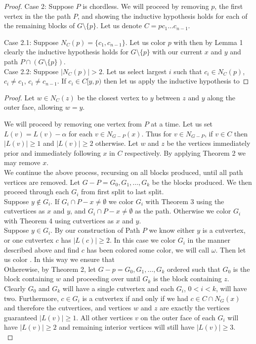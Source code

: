 \documentclass[12pt,a4paper]{article}
\begin{document}
\begin{adjustwidth}{2em}{2em}
\begin{proof}
\noindent Case 2: Suppose $P$ is chordless. We will proceed by removing $p$, the first vertex in the the path
$P$, and showing the inductive hypothesis holds for each of the remaining blocks of $G\setminus\{p\}$. Let
us denote $C=pc_1\ldots c_{n-1}$.

\noindent Case 2.1: Suppose $N_C(p)=\{c_1,c_{n-1}\}$. Let us color $p$ with  then by Lemma 1 clearly the inductive
hypothesis holds for $G\setminus\{p\}$ with our current $x$ and $y$ and path $P\cap (G\setminus\{p\})$.\\

\noindent Case 2.2: Suppose $|N_C(p)|>2$. Let us select largest $i$ such that $c_i\in N_C(p)$, $c_i\ne c_1$,
$c_i\ne c_{n-1}$. If $c_i\in C[y,p)$ then let us apply the inductive hypothesis to 

\end{proof}

\begin{proof}
Let $w\in N_C(z)$ be the closest vertex to $y$ between $z$ and $y$ along the outer face, allowing $w=y$.

We will proceed by removing one vertex from $P$ at a time. Let us set $L(v)=L(v)-\alpha$ for
each $v\in N_{G-P}(x)$. Thus for $v\in N_{G-P}$, if $v\in C$ then $|L(v)|\ge1$ and $|L(v)|\ge2$ otherwise.
Let $w$ and $z$ be the vertices immediately prior and immediately following $x$ in $C$ respectively.
By applying Theorem 2 we may remove $x$.\\

\noindent We continue the above process, recursing on all blocks produced, until all path vertices are removed.
Let $G-P=G_0,G_1,\ldots,G_k$ be the blocks produced. We then proceed through each $G_i$ from first split to last
split.\\

\noindent Suppose $y\not\in G_i$. If $G_i\cap P-x\ne\emptyset$ we color $G_i$ with Theorem 3 using the cutvertices
as $x$ and $y$, and $G_i\cap P-x\ne\emptyset$ as the path. Otherwise we color $G_i$ with Theorem 4 using
cutvertices as $x$ and $y$.\\

\noindent Suppose $y\in G_i$. By our construction of Path $P$ we know either $y$ is a cutvertex, or
one cutvertex $c$ has $|L(c)|\ge2$. In this case we color $G_i$ in the manner described above and find
$c$ has been colored some color, we will call $\omega$. Then let us color . In this way we ensure that \\

\noindent Otherewise, by Theorem 2, let $G-p=G_0,G_1,\ldots,G_k$ ordered such that $G_0$ is the block
containing $w$ and proceeding over until $G_k$ is the block containing $z$. Clearly $G_0$ and $G_k$ will
have a single cutvertex and each $G_i$, $0<i<k$, will have two. Furthermore, $c\in G_i$ is a cutvertex
if and only if we had $c\in C\cap N_G(x)$ and therefore the cutvertices, and vertices $w$ and $z$ are exactly
the vertices guaranteed
$|L(v)|\ge1$. All other vertices $v$ on the outer face of each $G_i$ will have $|L(v)|\ge2$ and remaining
interior vertices will still have $|L(v)|\ge3$.\\


\end{proof}
\end{adjustwidth}
\end{document}
